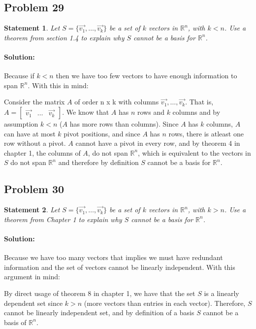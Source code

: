 \documentclass[12pt, letterpaper]{article}
\newcommand{\R}{\mathbb{R}}
\theoremstyle{statement}
\theoremstyle{statement}
\newtheorem*{atmStat}{Statement}
\newenvironment{Solution}{\noindent\ignorespaces\paragraph{Solution:}}{\hfill \ding{122}\par\noindent}
\begin{document}
    \subsection*{Problem 29}
    \begin{atmStat}
    Let $S=\{ \Vec{v_1}, \dots, \Vec{v_k} \}$ be a set of $k$ vectors in $\R^n$, with $k < n$. Use a theorem from section 1.4 to explain why $S$ cannot be a basis for $\R^n$.
    \end{atmStat}
    \begin{Solution}
    Because if $k < n$ then we have too few vectors to have enough information to span $\R^n$. With this in mind:
    
    Consider the matrix $A$ of order n x k with columns $\Vec{v_1}, \dots, \Vec{v_k}$. That is, $A=\begin{bmatrix} \Vec{v_1} & \dots & \Vec{v_k}\end{bmatrix}$. We know that $A$ has $n$ rows and $k$ columns and by assumption $k < n$ ($A$ has more rows than columns). Since $A$ has $k$ columns, $A$ can have at most $k$ pivot positions, and since $A$ has $n$ rows, there is atleast one row without a pivot. $A$ cannot have a pivot in every row, and by theorem 4 in chapter 1, the columns of $A$, do not span $\R^n$, which is equivalent to the vectors in $S$ do not span $\R^n$ and therefore by definition $S$ cannot be a basis for $\R^n$.
    \end{Solution}
    \subsection*{Problem 30}
    \begin{atmStat}
    Let $S= \{ \Vec{v_1}, \dots, \Vec{v_k}\}$ be a set of $k$ vectors in $\R^n$, with $k > n$. Use a theorem from Chapter 1 to explain why $S$ cannot be a basis for $\R^n$.
    \end{atmStat}
    \begin{Solution}
    Because we have too many vectors that implies we must have redundant information and the set of vectors cannot be linearly independent. With this argument in mind:
    
    By direct usage of theorem 8 in chapter 1, we have that the set $S$ is a linearly dependent set since $k > n$ (more vectors than entries in each vector). Therefore, $S$ cannot be linearly independent set, and by definition of a basis $S$ cannot be a basis of $\R^n$.
    \end{Solution}
    
\end{document}
